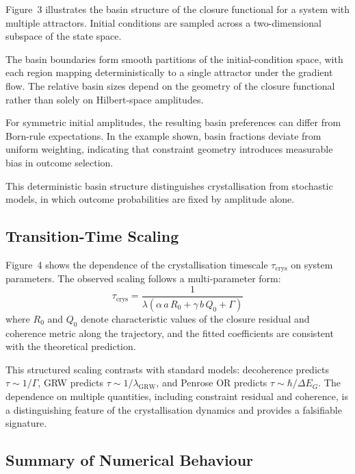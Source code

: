 \documentclass[12pt]{article}
\begin{document}
Figure~3 illustrates the basin structure of the closure functional for a system with multiple attractors. Initial conditions are sampled across a two-dimensional subspace of the state space.

The basin boundaries form smooth partitions of the initial-condition space, with each region mapping deterministically to a single attractor under the gradient flow. The relative basin sizes depend on the geometry of the closure functional rather than solely on Hilbert-space amplitudes.

For symmetric initial amplitudes, the resulting basin preferences can differ from Born-rule expectations. In the example shown, basin fractions deviate from uniform weighting, indicating that constraint geometry introduces measurable bias in outcome selection.

This deterministic basin structure distinguishes crystallisation from stochastic models, in which outcome probabilities are fixed by amplitude alone.

\subsection{Transition-Time Scaling}

Figure~4 shows the dependence of the crystallisation timescale $\tau_{\mathrm{crys}}$ on system parameters. The observed scaling follows a multi-parameter form:
\begin{equation}
\tau_{\mathrm{crys}} = \frac{1}{\lambda\!\left(\alpha\, a\, R_0 + \gamma\, b\, Q_0 + \Gamma\right)}
\end{equation}
where $R_0$ and $Q_0$ denote characteristic values of the closure residual and coherence metric along the trajectory, and the fitted coefficients are consistent with the theoretical prediction.

This structured scaling contrasts with standard models: decoherence predicts $\tau \sim 1/\Gamma$, GRW predicts $\tau \sim 1/\lambda_{\mathrm{GRW}}$, and Penrose OR predicts $\tau \sim \hbar/\Delta E_G$. The dependence on multiple quantities, including constraint residual and coherence, is a distinguishing feature of the crystallisation dynamics and provides a falsifiable signature.

\subsection{Summary of Numerical Behaviour}
\end{document}
